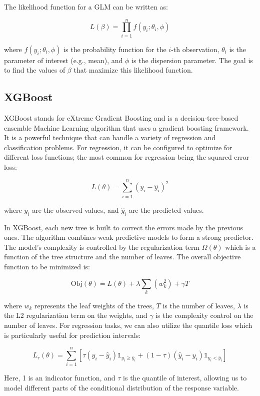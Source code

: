 \documentclass[
  super,
  preprint,
  3p]{elsarticle}
\begin{document}
The likelihood function for a GLM can be written as:

\[
L(\beta) = \prod_{i=1}^{n} f(y_i; \theta_i, \phi)
\]

where \(f(y_i; \theta_i, \phi)\) is the probability function for the
\(i\)-th observation, \(\theta_i\) is the parameter of interest (e.g.,
mean), and \(\phi\) is the dispersion parameter. The goal is to find the
values of \(\beta\) that maximize this likelihood function.

\hypertarget{xgboost}{%
\subsection{XGBoost}\label{xgboost}}

XGBoost stands for eXtreme Gradient Boosting and is a
decision-tree-based ensemble Machine Learning algorithm that uses a
gradient boosting framework. It is a powerful technique that can handle
a variety of regression and classification problems. For regression, it
can be configured to optimize for different loss functions; the most
common for regression being the squared error loss:

\[
L(\theta) = \sum_{i=1}^{n}(y_i - \hat{y}_i)^2
\]

where \(y_i\) are the observed values, and \(\hat{y}_i\) are the
predicted values.

In XGBoost, each new tree is built to correct the errors made by the
previous ones. The algorithm combines weak predictive models to form a
strong predictor. The model's complexity is controlled by the
regularization term \(\Omega(\theta)\) which is a function of the tree
structure and the number of leaves. The overall objective function to be
minimized is:

\[
\text{Obj}(\theta) = L(\theta) + \lambda \sum_{k}(w_k^2) + \gamma T
\]

where \(w_k\) represents the leaf weights of the trees, \(T\) is the
number of leaves, \(\lambda\) is the L2 regularization term on the
weights, and \(\gamma\) is the complexity control on the number of
leaves. For regression tasks, we can also utilize the quantile loss
which is particularly useful for prediction intervals:

\[
L_{\tau}(\theta) = \sum_{i=1}^{n} \left[ \tau (y_i - \hat{y}_i) \mathbb{1}_{y_i \geq \hat{y}_i} + (1 - \tau) (\hat{y}_i - y_i) \mathbb{1}_{y_i < \hat{y}_i} \right]
\]

Here, 1 is an indicator function, and \(\tau\) is the quantile of
interest, allowing us to model different parts of the conditional
distribution of the response variable.
\end{document}

